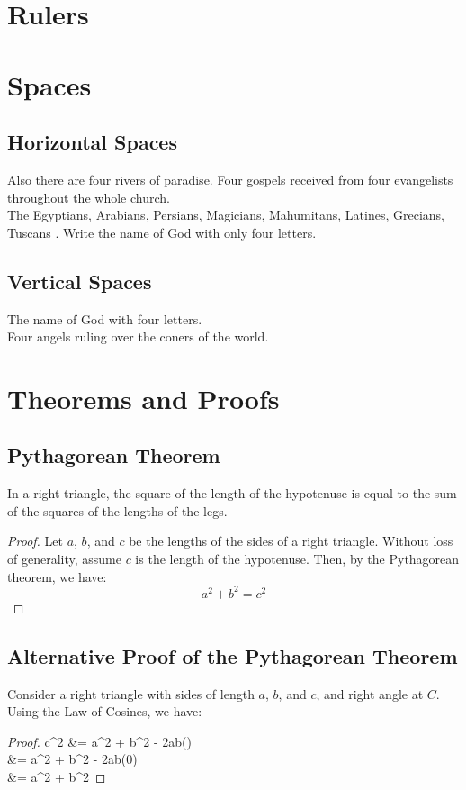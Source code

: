 \documentclass{article}
\begin{document}
\section{Rulers}
\noindent\makebox[\linewidth]{\rule{\textwidth}{0.4pt}}

\section{Spaces}
\subsection{Horizontal Spaces}
Also there are four rivers of paradise. \quad Four gospels received from four evangelists throughout the whole church. \\
The Egyptians, Arabians, Persians, Magicians, Mahumitans, Latines, Grecians, Tuscans . \qquad Write the name of God with only four letters.

\subsection{Vertical Spaces}
The name of God with four letters.\\[6pt]
Four angels ruling over the coners of the world. 

\section{Theorems and Proofs}
\subsection{Pythagorean Theorem}
\begin{theorem}
In a right triangle, the square of the length of the hypotenuse is equal to the sum of the squares of the lengths of the legs. 
\end{theorem}

\begin{proof}
Let \( a \), \( b \), and \( c \) be the lengths of the sides of a right triangle. Without loss of generality, assume \( c \) is the length of the hypotenuse. Then, by the Pythagorean theorem, we have:
\[
a^2 + b^2 = c^2
\]
\end {proof}

\subsection{Alternative Proof of the Pythagorean Theorem}
\begin{theorem} 
Consider a right triangle with sides of length $a$, $b$, and $c$, and right angle at $C$. Using the Law of Cosines, we have:
\end{theorem}
\begin{proof}

    c^2 &= a^2 + b^2 - 2ab\cos(\theta) \\
    &= a^2 + b^2 - 2ab(0) \\
    &= a^2 + b^2

\end{proof} 




\end{document}
